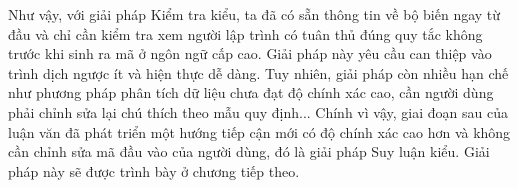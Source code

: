Như vậy, với giải pháp Kiểm tra kiểu, ta đã có sẵn thông tin về bộ biến ngay từ đầu và chỉ cần kiểm tra xem người lập trình có tuân thủ đúng quy tắc không trước khi sinh ra mã ở ngôn ngữ cấp cao. Giải pháp này yêu cầu can thiệp vào trình dịch ngược ít và hiện thực dễ dàng. Tuy nhiên, giải pháp còn nhiều hạn chế như phương pháp phân tích dữ liệu chưa đạt độ chính xác cao, cần người dùng phải chỉnh sửa lại chú thích theo mẫu quy định... Chính vì vậy, giai đoạn sau của luận văn đã phát triển một hướng tiếp cận mới có độ chính xác cao hơn và không cần chỉnh sửa mã đầu vào của người dùng, đó là giải pháp Suy luận kiểu. Giải pháp này sẽ được trình bày ở chương tiếp theo.



